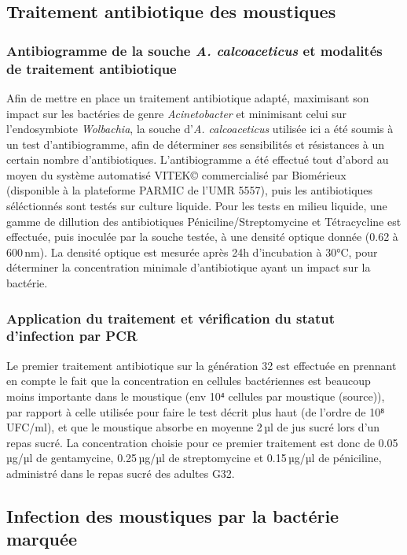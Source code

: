\subsection{Traitement antibiotique des moustiques}

\subsubsection{Antibiogramme de la souche \textit{A. calcoaceticus} et modalités de traitement antibiotique}

Afin de mettre en place un traitement antibiotique adapté, maximisant son impact sur les bactéries de genre \textit{Acinetobacter} et minimisant celui sur l'endosymbiote \textit{Wolbachia}, la souche d'\textit{A. calcoaceticus} utilisée ici a été soumis à un test d'antibiogramme, afin de déterminer ses sensibilités et résistances à un certain nombre d'antibiotiques.
L'antibiogramme a été effectué tout d'abord au moyen du système automatisé VITEK© commercialisé par Biomérieux (disponible à la plateforme PARMIC de l'UMR 5557), puis les antibiotiques séléctionnés sont testés sur culture liquide.
Pour les tests en milieu liquide, une gamme de dillution des antibiotiques Péniciline/Streptomycine et Tétracycline est effectuée, puis inoculée par la souche testée, à une densité optique donnée (0.62 à 600\,nm).
La densité optique est mesurée après 24h d'incubation à 30°C, pour déterminer la concentration minimale d'antibiotique ayant un impact sur la bactérie.

\subsubsection{Application du traitement et vérification du statut d'infection par PCR}

Le premier traitement antibiotique sur la génération 32 est effectuée en prennant en compte le fait que la concentration en cellules bactériennes est beaucoup moins importante dans le moustique (env 10⁴ cellules par moustique (source)), par rapport à celle utilisée pour faire le test décrit plus haut (de l'ordre de 10⁸ UFC/ml), et que le moustique absorbe en moyenne 2\,µl de jus sucré lors d'un repas sucré.
La concentration choisie pour ce premier traitement est donc de 0.05\,µg/µl de gentamycine, 0.25\,µg/µl de streptomycine et 0.15\,µg/µl de péniciline, administré dans le repas sucré des adultes G32.


\subsection{Infection des moustiques par la bactérie marquée}

